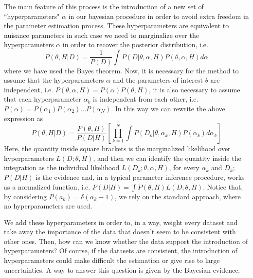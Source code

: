 \documentclass[onecolumn,           %
               showpacs,            %
               preprintnumbers,     %
               aps,                 %
               letterpaper,             %
               superscriptaddress,      %
               nofootinbib,         %
               tightenlines,        %
               floats,floatfix      %
               ,usenatbib,
               ]{revtex4-1}
\begin{document}
The main feature of this process is the introduction of a new set of ``hyperparameters" $\alpha$ in our bayesian procedure in order to avoid extra freedom in the parameter estimation process.  These hyperparameters are equivalent to nuisance parameters in such case we need to marginalize over the hyperparameters $\alpha$ in order to recover the posterior distribution, i.e.
\begin{equation}
P(\theta,H|D)=\frac{1}{P(D)}\int P(D|\theta,\alpha,H)P(\theta,\alpha,H)d\alpha
\end{equation}
where we have used the Bayes theorem. Now, it is necessary for the method to assume that the hyperparameters $\alpha$ and the parameters of interest $\theta$ are independent, i.e. $P(\theta,\alpha,H)=P(\alpha)P(\theta,H)$, it is also necessary to assume that each hyperparameter $\alpha_k$ is independent from each other, i.e. $P(\alpha)=P(\alpha_1)P(\alpha_2)...P(\alpha_N)$. In this way we can rewrite the above expression as
\begin{equation}
P(\theta,H|D)=\frac{P(\theta,H)}{P(D|H)}\left[\prod_{k=1}^N\int P(D_k|\theta,\alpha_k,H)P(\alpha_k)d\alpha_k\right]
\end{equation}
Here, the quantity inside square brackets is the marginalized likelihood over hyperparameters $L(D;\theta,H)$, and then we can identify the quantity inside the integration as the individual likelihood $L(D_k;\theta,\alpha,H)$, for every $\alpha_k$ and $D_k$; $P(D|H)$ is the evidence and, in a typical parameter inference procedure, works as a normalized function, i.e. $P(D|H)=\int P(\theta,H)L(D;\theta,H)$. Notice that, by considering $P(a_k)=\delta(\alpha_k-1)$, we rely on the standard approach, where no hyperparameters are used.  

We add these hyperparameters in order to, in a way, weight every dataset and take away the importance of the data that doesn't seem to be consistent with other ones. Then, how can we know whether the data support the introduction of hyperparameters? Of course, if the datasets are consistent, the introduction of hyperparameters could make difficult the estimation or give rise to large uncertainties. A way to answer this question is given by the Bayesian evidence.
\end{document}
